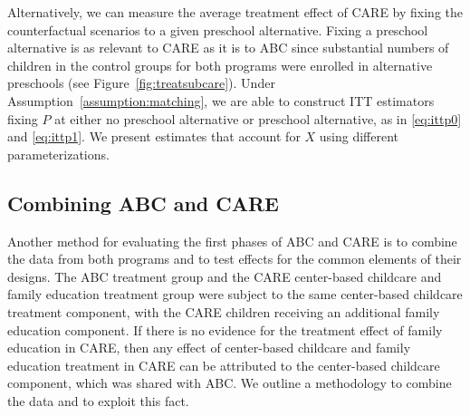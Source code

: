 \noindent Alternatively, we can measure the average treatment effect of CARE by fixing the counterfactual scenarios to a given preschool alternative. Fixing a preschool alternative is as relevant to CARE as it is to ABC since substantial numbers of children in the control groups for both programs were enrolled in alternative preschools (see Figure~\ref{fig:treatsubcare}). Under Assumption~\ref{assumption:matching}, we are able to construct ITT estimators fixing $P$ at either no preschool alternative or preschool alternative, as in \eqref{eq:ittp0} and \eqref{eq:ittp1}. We present estimates that account for $X$ using different parameterizations.\\

\subsection{Combining ABC and CARE} \label{section:combine}

\noindent Another method for evaluating the first phases of ABC and CARE is to combine the data from both programs and to test effects for the common elements of their designs. The ABC treatment group and the CARE center-based childcare and family education treatment group were subject to the same center-based childcare treatment component, with the CARE children receiving an additional family education component. If there is no evidence for the treatment effect of family education in CARE, then any effect of center-based childcare and family education treatment in CARE can be attributed to the center-based childcare component, which was shared with ABC. We outline a methodology to combine the data and to exploit this fact.\\

